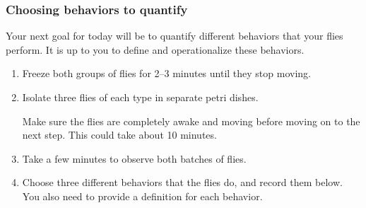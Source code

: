 \documentclass[letterpaper,10pt,english]{jupyterBook}
\begin{document}
\subsubsection{Choosing behaviors to quantify}
\label{\detokenize{Drosophila/Day1:choosing-behaviors-to-quantify}}
\sphinxAtStartPar
Your next goal for today will be to quantify  different behaviors that your flies perform. It is up to you to define and operationalize these behaviors.
\begin{enumerate}
%
\item {} 
\sphinxAtStartPar
Freeze both groups of flies for 2–3 minutes until they stop moving.

\item {} 
\sphinxAtStartPar
Isolate three flies of each type in separate petri dishes.

\sphinxAtStartPar
{} Make sure the flies are completely awake and moving before moving on to the next step. This could take about 10 minutes.

\item {} 
\sphinxAtStartPar
Take a few minutes to observe both batches of flies.

\item {} 
\sphinxAtStartPar
Choose three different behaviors that the flies do, and record them below. You also need to provide a definition for each behavior.

\end{enumerate}

\sphinxAtStartPar
{}
\end{document}
